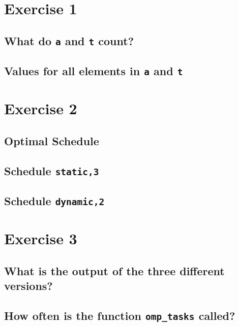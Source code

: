 \documentclass[a4paper,%
11pt,%
DIV12,
headsepline,%
headings=normal,
]{scrartcl}
\begin{document}
\maketitlepage




\section{Exercise 1}

\subsection{What do \texttt{a} and \texttt{t} count?}

\subsection{Values for all elements in \texttt{a} and \texttt{t}}

\section{Exercise 2}

\subsection{Optimal Schedule}

\subsection{Schedule \texttt{static,3}}

\subsection{Schedule \texttt{dynamic,2}}

\section{Exercise 3}

\subsection{What is the output of the three different versions?}

\subsection{How often is the function \texttt{omp\_tasks} called?}
\end{document}
